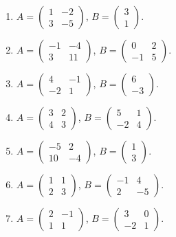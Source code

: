 \begin{enumerate}[label=\arabic*.,  leftmargin=*]
\item $A=\begin{pmatrix}1&-2\\3&-5\end{pmatrix}$, $B=\begin{pmatrix}3\\1\end{pmatrix}$.
\item $A=\begin{pmatrix}-1&-4\\3&11\end{pmatrix}$, $B=\begin{pmatrix}0&2\\-1&5\end{pmatrix}$.
\item $A=\begin{pmatrix}4&-1\\-2&1\end{pmatrix}$, $B=\begin{pmatrix}6\\-3\end{pmatrix}$.
\item $A=\begin{pmatrix}3&2\\4&3\end{pmatrix}$, $B=\begin{pmatrix}5&1\\-2&4\end{pmatrix}$.
\item $A=\begin{pmatrix}-5&2\\10&-4\end{pmatrix}$, $B=\begin{pmatrix}1\\3\end{pmatrix}$.
\item $A=\begin{pmatrix}1&1\\2&3\end{pmatrix}$, $B=\begin{pmatrix}-1&4\\2&-5\end{pmatrix}$.
\item $A=\begin{pmatrix}2&-1\\1&1\end{pmatrix}$, $B=\begin{pmatrix}3&0\\-2&1\end{pmatrix}$.
\end{enumerate}
